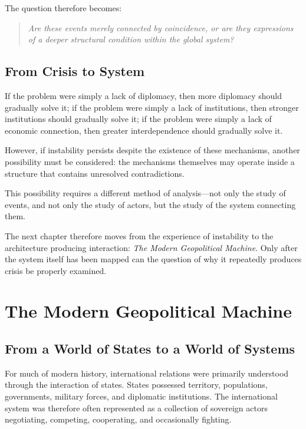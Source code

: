 \documentclass[11pt,openany]{book}
\theoremstyle{plain}
\theoremstyle{definition}
\begin{document}
The question therefore becomes:
\begin{quote}
\textit{Are these events merely connected by coincidence, or are they expressions of a deeper structural condition within the global system?}
\end{quote}

\section*{From Crisis to System}

If the problem were simply a lack of diplomacy, then more diplomacy should gradually solve it; if the problem were simply a lack of institutions, then stronger institutions should gradually solve it; if the problem were simply a lack of economic connection, then greater interdependence should gradually solve it.

However, if instability persists despite the existence of these mechanisms, another possibility must be considered: the mechanisms themselves may operate inside a structure that contains unresolved contradictions.

This possibility requires a different method of analysis—not only the study of events, and not only the study of actors, but the study of the system connecting them.

The next chapter therefore moves from the experience of instability to the architecture producing interaction: \textit{The Modern Geopolitical Machine}. Only after the system itself has been mapped can the question of why it repeatedly produces crisis be properly examined.

\chapter{The Modern Geopolitical Machine}

\section*{From a World of States to a World of Systems}

For much of modern history, international relations were primarily understood through the interaction of states. States possessed territory, populations, governments, military forces, and diplomatic institutions. The international system was therefore often represented as a collection of sovereign actors negotiating, competing, cooperating, and occasionally fighting.
\end{document}
